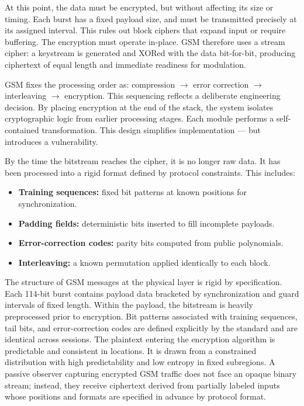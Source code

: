 At this point, the data must be encrypted, but without affecting its size or timing. Each burst has a fixed payload size, and must be transmitted precisely at its assigned interval. This rules out block ciphers that expand input or require buffering. The encryption must operate in-place. GSM therefore uses a stream cipher: a keystream is generated and XORed with the data bit-for-bit, producing ciphertext of equal length and immediate readiness for modulation.

GSM fixes the processing order as: compression $\rightarrow$ error correction $\rightarrow$ interleaving $\rightarrow$ encryption. This sequencing reflects a deliberate engineering decision. By placing encryption at the end of the stack, the system isolates cryptographic logic from earlier processing stages. Each module performs a self-contained transformation. This design simplifies implementation — but introduces a vulnerability.


By the time the bitstream reaches the cipher, it is no longer raw data. It has been processed into a rigid format defined by protocol constraints. This includes:

\begin{itemize}
  \item \textbf{Training sequences:} fixed bit patterns at known positions for synchronization.
  \item \textbf{Padding fields:} deterministic bits inserted to fill incomplete payloads.
  \item \textbf{Error-correction codes:} parity bits computed from public polynomials.
  \item \textbf{Interleaving:} a known permutation applied identically to each block.
\end{itemize}

The structure of GSM messages at the physical layer is rigid by specification. Each 114-bit burst contains payload data bracketed by synchronization and guard intervals of fixed length. Within the payload, the bitstream is heavily preprocessed prior to encryption. Bit patterns associated with training sequences, tail bits, and error-correction codes are defined explicitly by the standard and are identical across sessions. The plaintext entering the encryption algorithm is predictable and consistent in locations. It is drawn from a constrained distribution with high predictability and low entropy in fixed subregions. A passive observer capturing encrypted GSM traffic does not face an opaque binary stream; instead, they receive ciphertext derived from partially labeled inputs whose positions and formats are specified in advance by protocol format.

